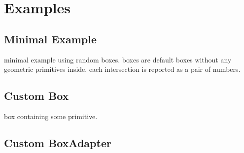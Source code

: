 \section*{Examples}
\subsection*{Minimal Example}
minimal example using random boxes. boxes are default boxes without any geometric primitives inside. each intersection is reported as a pair of numbers. 

\subsection*{Custom Box}
box containing some primitive.

\subsection*{Custom BoxAdapter }



